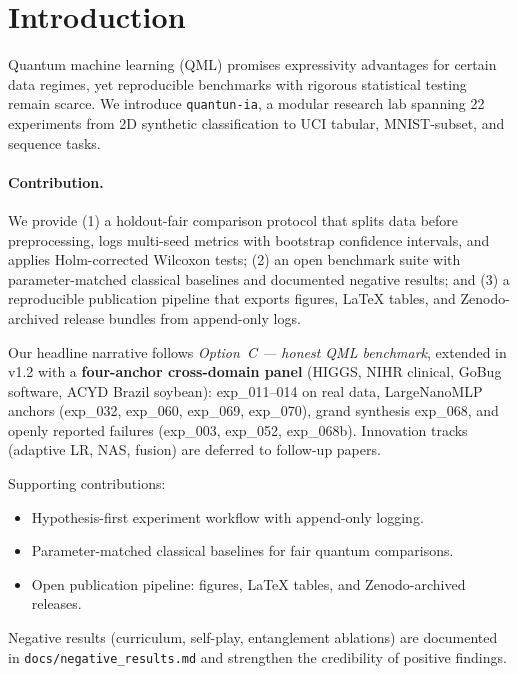 \section{Introduction}
\label{sec:introduction}

Quantum machine learning (QML) promises expressivity advantages for certain data regimes,
yet reproducible benchmarks with rigorous statistical testing remain scarce.
We introduce \texttt{quantun-ia}, a modular research lab spanning 22 experiments
from 2D synthetic classification to UCI tabular, MNIST-subset, and sequence tasks.

\paragraph{Contribution.}
We provide (1) a holdout-fair comparison protocol that splits data before preprocessing,
logs multi-seed metrics with bootstrap confidence intervals, and applies Holm-corrected
Wilcoxon tests; (2) an open benchmark suite with parameter-matched classical baselines
and documented negative results; and (3) a reproducible publication pipeline that
exports figures, LaTeX tables, and Zenodo-archived release bundles from append-only logs.

Our headline narrative follows \emph{Option~C --- honest QML benchmark}, extended in v1.2
with a \textbf{four-anchor cross-domain panel} (HIGGS, NIHR clinical, GoBug software,
ACYD Brazil soybean): exp\_011--014 on real data, LargeNanoMLP anchors (exp\_032,
exp\_060, exp\_069, exp\_070), grand synthesis exp\_068, and openly reported failures
(exp\_003, exp\_052, exp\_068b).
Innovation tracks (adaptive LR, NAS, fusion) are deferred to follow-up papers.

Supporting contributions:
\begin{itemize}
  \item Hypothesis-first experiment workflow with append-only logging.
  \item Parameter-matched classical baselines for fair quantum comparisons.
  \item Open publication pipeline: figures, LaTeX tables, and Zenodo-archived releases.
\end{itemize}

Negative results (curriculum, self-play, entanglement ablations) are documented
in \texttt{docs/negative\_results.md} and strengthen the credibility of positive findings.
